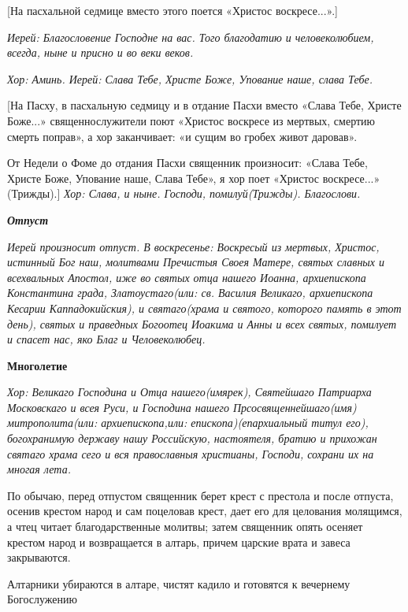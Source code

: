   [На пасхальной седмице вместо этого поется «Христос воскресе...».]


 \itshape  Иерей:\normalfont{} Благословение Господне на вас. Того благодатию и человеколюбием, всегда, ныне и присно и во веки веков.


\itshape  Хор:\normalfont{} Аминь. \itshape  Иерей:\normalfont{} Слава Тебе, Христе Боже, Упование наше, слава Тебе.


    [На Пасху, в пасхальную седмицу и в отдание Пасхи вместо «Слава Тебе, Христе Боже...» священнослужители поют «Христос воскресе из мертвых, смертию смерть поправ», а хор заканчивает: «и сущим во гробех живот даровав». 


    От Недели о Фоме до отдания Пасхи священник произносит: «Слава Тебе, Христе Боже, Упование наше, Слава Тебе», я хор поет «Христос воскресе...» (Трижды).] \itshape  Хор: Слава, и ныне.\normalfont{} Господи, помилуй\itshape  (Трижды).\normalfont{} Благослови. 


\medskip\bfseries \itshape  Отпуст \normalfont{}\normalfont{}\nopagebreak


\itshape  Иерей произносит отпуст. В воскресенье:\normalfont{} Воскресый из мертвых, Христос, истинный Бог наш, молитвами Пречистыя Своея Матере, святых славных и всехвальных Апостол, иже во святых отца нашего Иоанна, архиепископа Константина града, Златоустаго\itshape  (или:\normalfont{} св. Василия Великаго, архиепископа Кесарии Каппадокийския), и святаго\itshape  (храма и святого, которого память в этот день),\normalfont{} святых и праведных Богоотец Иоакима и Анны и всех святых, помилует и спасет нас, яко Благ и Человеколюбец.


\medskip\bfseries  Многолетие \normalfont{}\nopagebreak


\itshape  Хор:\normalfont{} Великаго Господина и Отца нашего\itshape  (имярек\normalfont{}), Святейшаго Патриарха Московскаго и всея Руси, и Господина нашего Прсосвященнейшаго\itshape  (имя)\normalfont{} митрополита\itshape  (или:\normalfont{} архиепископа,\itshape  или:\normalfont{} епископа)\itshape  (епархиальный титул его),\normalfont{} богохранимую державу нашу Российскую, настоятеля, братию и прихожан святаго храма сего и вся православныя христианы, Господи, сохрани их на многая лета.


\medskip  По обычаю, перед отпустом священник берет крест с престола и после отпуста, осенив крестом народ и сам поцеловав крест, дает его для целования молящимся, а чтец читает благодарственные молитвы; затем священник опять осеняет крестом народ и возвращается в алтарь, причем царские врата и завеса закрываются.


  Алтарники убираются в алтаре, чистят кадило и готовятся к вечернему Богослужению
\mychapterending

